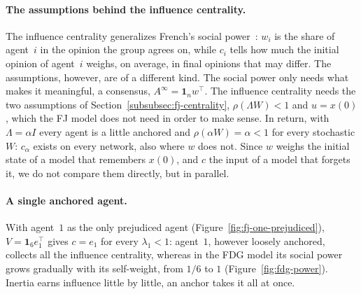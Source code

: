 \paragraph{The assumptions behind the influence centrality.}
The influence centrality generalizes French's social
power~\cite{proskurnikov2017tutorial}: $w_i$ is the share of agent~$i$ in the opinion the
group agrees on, while $c_i$ tells how much the initial opinion of agent~$i$ weighs, on
average, in final opinions that may differ.
 The assumptions, however, are of a different kind. The social
power only needs what makes it meaningful, a consensus, $A^\infty = \mathbf{1}_n w^\top$.
The influence centrality needs the two assumptions of
Section~\ref{subsubsec:fj-centrality}, $\rho(\Lambda W) < 1$ and $u = x(0)$, which the FJ
model does not need in order to make sense.
 In return, with $\Lambda = \alpha I$ every agent is a little
anchored and $\rho(\alpha W) = \alpha < 1$ for every stochastic $W$: $c_\alpha$ exists on
every network, also where $w$ does not. Since
 $w$ weighs the initial state of a
model that remembers $x(0)$, and $c$ the input of a model that forgets it, we do not
compare them directly, but in parallel.

\paragraph{A single anchored agent.}
With agent~$1$ as the only prejudiced agent (Figure~\ref{fig:fj-one-prejudiced}),
$V = \mathbf{1}_6 e_1^\top$ gives $c = e_1$ for every $\lambda_1 < 1$: agent~$1$, however
loosely anchored, collects all the influence centrality, whereas in the FDG model its
social power grows gradually with its self-weight, from $1/6$ to $1$
(Figure~\ref{fig:fdg-power}). Inertia earns influence little by little, an anchor takes it
all at once.

